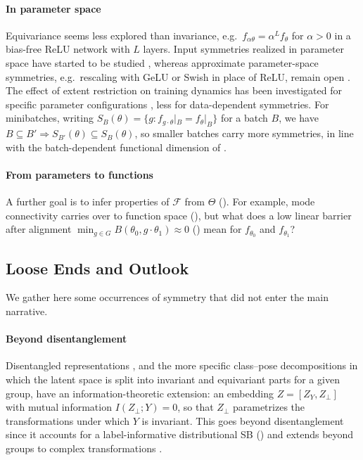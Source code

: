 \documentclass[mathematics,review,submit,moreauthors]{Definitions/mdpi}
\begin{document}
\paragraph{In parameter space}
Equivariance seems less explored than invariance, e.g.\ $f_{\alpha\theta}=\alpha^L f_\theta$ for $\alpha>0$ in a bias-free ReLU network with $L$ layers.
Input symmetries realized in parameter space have started to be studied \citep{galley2026}, whereas approximate parameter-space symmetries, e.g.\ rescaling with GeLU or Swish in place of ReLU, remain open \citep{ziyin2025a}.
The effect of extent restriction on training dynamics has been investigated for specific parameter configurations \citep{ziyin2025}, less for data-dependent symmetries.
For minibatches, writing $S_B(\theta)=\{g: f_{g\cdot\theta}|_B=f_\theta|_B\}$ for a batch $B$, we have $B\subseteq B'\Rightarrow S_{B'}(\theta)\subseteq S_B(\theta)$, so smaller batches carry more symmetries, in line with the batch-dependent functional dimension of \citet{elisendagrigsby2025aim}.

\paragraph{From parameters to functions}
A further goal is to infer properties of $\mathcal{F}$ from $\Theta$ ().
For example, mode connectivity carries over to function space (), but what does a low linear barrier after alignment $\min_{g\in G}B(\theta_0,g\cdot\theta_1)\approx 0$ () mean for $f_{\theta_0}$ and $f_{\theta_1}$?

\subsection{Loose Ends and Outlook}\label{sec:loose-ends}
We gather here some occurrences of symmetry that did not enter the main narrative.

\paragraph{Beyond disentanglement}
Disentangled representations \citep{higgins2018}, and the more specific class--pose decompositions \citep{winter2022anips,marchetti2023p2icais} in which the latent space is split into invariant and equivariant parts for a given group, have an information-theoretic extension: an embedding $Z=[Z_Y,Z_\perp]$ with mutual information $I(Z_\perp;Y)=0$, so that $Z_\perp$ parametrizes the transformations under which $Y$ is invariant.
This goes beyond disentanglement since it accounts for a label-informative distributional SB () and extends beyond groups to complex transformations \citep{wieser2020anips}.
\end{document}
